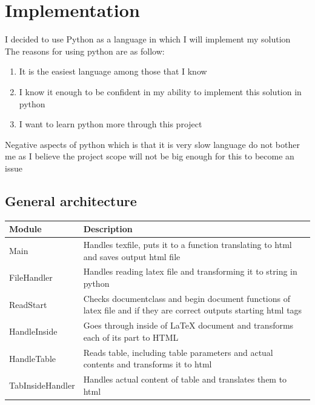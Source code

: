 \section{Implementation}
I decided to use Python as a language in which I will implement my solution \\ 
The reasons for using python are as follow:
\begin{enumerate}
    \item It is the easiest language among those that I know
    \item I know it enough to be confident in my ability to implement this solution in python
    \item I want to learn python more through this project
\end{enumerate}
Negative aspects of python which is that it is very slow language do not bother me as I believe the project scope will not be big enough for this to become an issue
  
\subsection{General architecture}
\begin{tabular}{|l|p{10cm}|}
    \hline 
    Module & Description \\ 
    \hline 
    Main & Handles texfile, puts it to a function translating to html and saves output html file \\
    \hline
    FileHandler & Handles reading latex file and transforming it to string in python  \\ 
    \hline 
    ReadStart & Checks documentclass and begin document functions of latex file and if they are correct outputs starting html tags \\
    \hline
    HandleInside & Goes through inside of LaTeX document and transforms each of its part to HTML
    \\
    \hline
    HandleTable & Reads table, including table parameters and actual contents and transforms it to html \\ 
    \hline
    TabInsideHandler & Handles actual content of table and translates them to html \\
\end{tabular}







